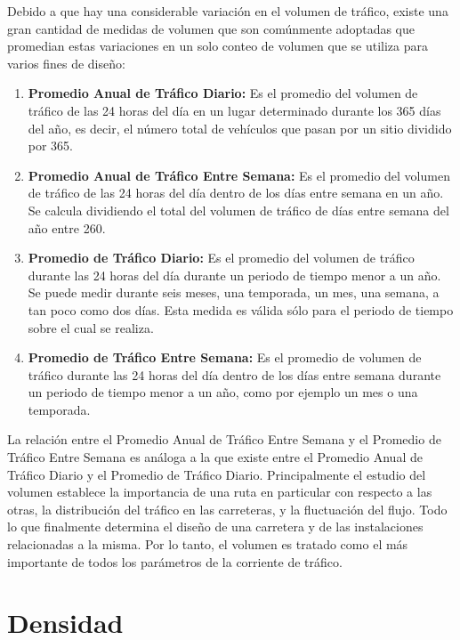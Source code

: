 Debido a que hay una considerable variación en el volumen de tráfico, existe una gran cantidad de medidas de volumen que son comúnmente adoptadas que promedian estas variaciones en un solo conteo de volumen que se utiliza para varios fines de diseño:
\begin{enumerate}
\item \textbf{Promedio Anual de Tráfico Diario:} Es el promedio del volumen de tráfico de las 24 horas del día en un lugar determinado durante los 365 días del año, es decir, el número total de vehículos que pasan por un sitio dividido por 365.

\item \textbf{Promedio Anual de Tráfico Entre Semana:} Es el promedio del volumen de tráfico de las 24 horas del día dentro de los días entre semana en un año. Se calcula dividiendo el total del volumen de tráfico de días entre semana del año entre 260.

\item \textbf{Promedio de Tráfico Diario:} Es el promedio del volumen de tráfico durante las 24 horas del día durante un periodo de tiempo menor a un año. Se puede medir durante seis meses, una temporada, un mes, una semana, a tan poco como dos días. Esta medida es válida sólo para el periodo de tiempo sobre el cual se realiza.

\item \textbf{Promedio de Tráfico Entre Semana:} Es el promedio de volumen de tráfico durante las 24 horas del día dentro de los días entre semana durante un periodo de tiempo menor a un año, como por ejemplo un mes o una temporada.
\end{enumerate}
La relación entre el Promedio Anual de Tráfico Entre Semana y el Promedio de Tráfico Entre Semana es análoga a la que existe entre el Promedio Anual de Tráfico Diario y el Promedio de Tráfico Diario. Principalmente el estudio del volumen establece la importancia de una ruta en particular con respecto a las otras, la distribución del tráfico en las carreteras, y la fluctuación del flujo. Todo lo que finalmente determina el diseño de una carretera y de las instalaciones relacionadas a la misma. Por lo tanto, el volumen es tratado como el más importante de todos los parámetros de la corriente de tráfico.

\section{Densidad}

